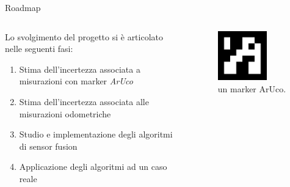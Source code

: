 \documentclass{beamer}
\begin{document}
\begin{frame}{Roadmap}
\begin{columns}
\begin{column}{0.6\textwidth}
Lo svolgimento del progetto si è articolato nelle seguenti fasi:
\begin{enumerate}
    \item Stima dell'incertezza associata a misurazioni con marker \emph{ArUco}
    \item Stima dell'incertezza associata alle misurazioni odometriche
    \item Studio e implementazione degli algoritmi di sensor fusion
    \item Applicazione degli algoritmi ad un caso reale
\end{enumerate}
\end{column}
\begin{column}{0.4\textwidth}
    \begin{figure}
        \centering
        \includegraphics[width=0.7\textwidth]{images/marker23.png}
        \caption{un marker ArUco.}
        \label{fig:markerArUco}
    \end{figure}
\end{column}
\end{columns}
\end{frame}
\end{document}
